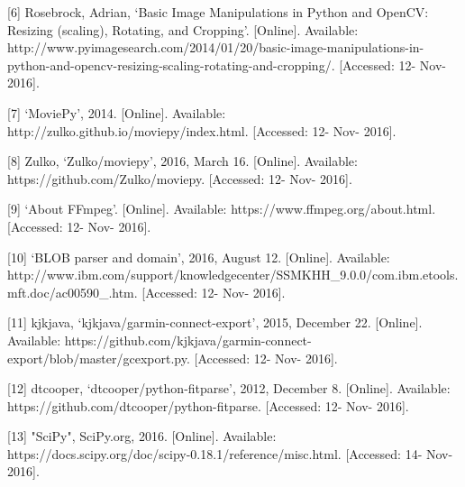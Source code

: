 \documentclass[10pt,draftclsnofoot,onecolumn]{IEEEtran}
\begin{document}
 \vspace{2mm}

[6] Rosebrock, Adrian, ‘Basic Image Manipulations in Python and OpenCV: Resizing (scaling), Rotating, and Cropping’. [Online]. Available: http://www.pyimagesearch.com/2014/01/20/basic-image-manipulations-in-python-and-opencv-resizing-scaling-rotating-and-cropping/. [Accessed: 12- Nov- 2016]. \\

 \vspace{2mm}

[7] ‘MoviePy’, 2014. [Online]. Available: http://zulko.github.io/moviepy/index.html. [Accessed: 12- Nov- 2016].  \\
 \vspace{2mm}


[8] Zulko, ‘Zulko/moviepy’, 2016, March 16. [Online]. Available: https://github.com/Zulko/moviepy.  [Accessed: 12- Nov- 2016]. \\
 \vspace{2mm}


[9] ‘About FFmpeg’. [Online]. Available: https://www.ffmpeg.org/about.html. [Accessed: 12- Nov- 2016].  \\

 \vspace{2mm}

[10] ‘BLOB parser and domain’, 2016, August 12. [Online]. Available: http://www.ibm.com/support/knowledgecenter/SSMKHH_9.0.0/com.ibm.etools.mft.doc/ac00590_.htm. [Accessed: 12- Nov- 2016].  \\
 \vspace{2mm}


[11] kjkjava, ‘kjkjava/garmin-connect-export’, 2015, December 22. [Online]. Available: https://github.com/kjkjava/garmin-connect-export/blob/master/gcexport.py. [Accessed: 12- Nov- 2016].  \\
 \vspace{2mm}


[12] dtcooper, ‘dtcooper/python-fitparse’, 2012, December 8. [Online]. Available: https://github.com/dtcooper/python-fitparse. [Accessed: 12- Nov- 2016]. \\

 \vspace{2mm}

[13] "SciPy", SciPy.org, 2016. [Online]. Available: https://docs.scipy.org/doc/scipy-0.18.1/reference/misc.html. [Accessed: 14- Nov- 2016].\\

 \vspace{2mm}
\end{document}
